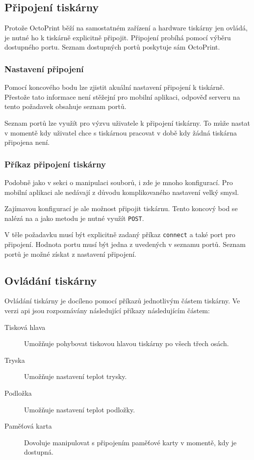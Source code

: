 \subsection{Připojení tiskárny}

Protože OctoPrint běží na samostatném zařízení a hardware tiskárny jen ovládá, je nutné ho k tiskárně explicitně připojit.
Připojení probíhá pomocí výběru dostupného portu.
Seznam dostupných portů poskytuje sám OctoPrint.

\subsubsection*{Nastavení připojení}

Pomocí koncového bodu  lze zjistit akuální nastavení připojení k tiskárně.
Přestože tato informace není stěžejní pro mobilní aplikaci, odpověď serveru na tento požadavek obsahuje seznam portů.

Seznam portů lze využít pro výzvu uživatele k připojení tiskárny.
To může nastat v momentě kdy uživatel chce s tiskárnou pracovat v době kdy žádná tiskárna připojena není.

\subsubsection*{Příkaz připojení tiskárny}

Podobně jako v sekci o manipulaci souborů, i zde je mnoho konfigurací.
Pro mobilní aplikaci ale nedávají z důvodu komplikovaného nastavení velký smysl.

Zajímavou konfigurací je ale možnost připojit tiskárnu.
Tento koncový bod se nalézá na  a jako metodu je nutné využít \texttt{POST}.

V těle požadavku musí být explicitně zadaný příkaz \texttt{connect} a také port pro připojení.
Hodnota portu musí být jedna z uvedených v seznamu portů.
Seznam portů je možné získat z nastavení připojení.

\subsection{Ovládání tiskárny}

Ovládání tiskárny je docíleno pomocí příkazů jednotlivým částem tiskárny.
Ve verzi \acrshort{api} \vapi{} jsou rozpoznávány následující příkazy následujícím částem:

\begin{description}
	\item[Tisková hlava] Umožňuje pohybovat tiskovou hlavou tiskárny po všech třech osách.
	\item[Tryska] Umožňuje nastavení teplot trysky.
	\item[Podložka] Umožňuje nastavení teplot podložky.
	\item[Paměťová karta] Dovoluje manipulovat s připojením paměťové karty v momentě, kdy je dostupná.
\end{description}

